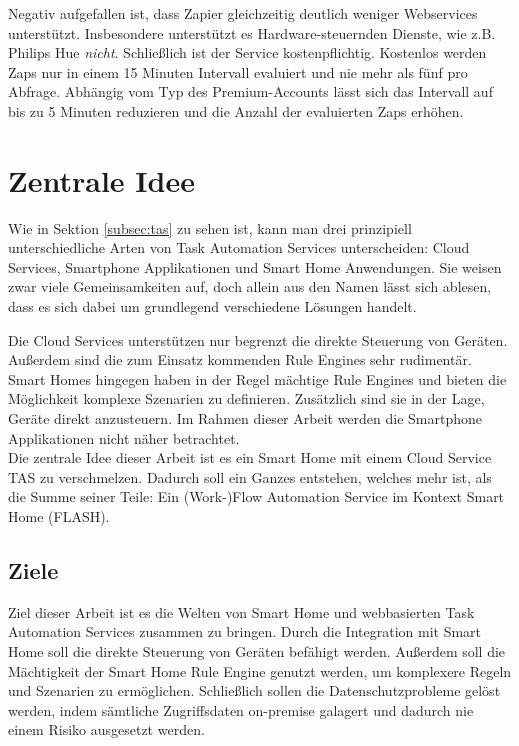 Negativ aufgefallen ist, dass Zapier gleichzeitig deutlich weniger Webservices unterstützt. Insbesondere unterstützt es Hardware-steuernden Dienste, wie z.B. Philips Hue \textit{nicht}. Schließlich ist der Service kostenpflichtig. Kostenlos werden Zaps nur in einem 15 Minuten Intervall evaluiert und nie mehr als fünf pro Abfrage. Abhängig vom Typ des Premium-Accounts lässt sich das Intervall auf bis zu 5 Minuten reduzieren und die Anzahl der evaluierten Zaps erhöhen.

\section{Zentrale Idee}
\label{sec:idee}
Wie in Sektion \ref{subsec:tas} zu sehen ist, kann man drei prinzipiell unterschiedliche Arten von Task Automation Services unterscheiden: Cloud Services, Smartphone Applikationen und Smart Home Anwendungen. Sie weisen zwar viele Gemeinsamkeiten auf, doch allein aus den Namen lässt sich ablesen, dass es sich dabei um grundlegend verschiedene Lösungen handelt. 

Die Cloud Services unterstützen nur begrenzt die \glqq direkte\grqq{}  Steuerung von Geräten. Außerdem sind die zum Einsatz kommenden Rule Engines sehr rudimentär. Smart Homes hingegen haben in der Regel mächtige Rule Engines und bieten die Möglichkeit komplexe Szenarien zu definieren. Zusätzlich sind sie in der Lage, Geräte direkt anzusteuern. Im Rahmen dieser Arbeit werden die Smartphone Applikationen nicht näher betrachtet.\\

Die zentrale Idee dieser Arbeit ist es ein Smart Home mit einem Cloud Service TAS zu verschmelzen. Dadurch soll ein Ganzes entstehen, welches mehr ist, als die Summe seiner Teile: Ein (Work-)Flow Automation Service im Kontext Smart Home (FLASH).

\subsection{Ziele}
\label{sec:ziele}
Ziel dieser Arbeit ist es die Welten von Smart Home und webbasierten Task Automation Services zusammen zu bringen. Durch die Integration mit Smart Home soll die direkte Steuerung von Geräten befähigt werden. Außerdem soll die Mächtigkeit der Smart Home Rule Engine genutzt werden, um komplexere Regeln und Szenarien zu ermöglichen. Schließlich sollen die Datenschutzprobleme gelöst werden, indem sämtliche Zugriffsdaten on-premise galagert und dadurch nie einem Risiko ausgesetzt werden.


